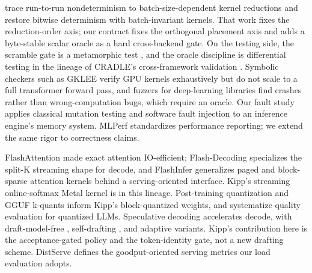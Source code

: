 \documentclass[sigconf,nonacm,screen]{acmart}
\begin{document}
\citet{he2025defeating} trace run-to-run nondeterminism to
batch-size-dependent kernel reductions and restore bitwise determinism with
batch-invariant kernels. That work fixes the reduction-order axis; our
contract fixes the orthogonal placement axis and adds a byte-stable scalar
oracle as a hard cross-backend gate. On the testing side, the scramble gate
is a metamorphic test \citep{chen2018metamorphic}, and the oracle discipline
is differential testing \citep{mckeeman1998differential} in the lineage of
CRADLE's cross-framework validation \citep{pham2019cradle}. Symbolic
checkers such as GKLEE \citep{li2012gklee} verify GPU kernels exhaustively
but do not scale to a full transformer forward pass, and fuzzers for
deep-learning libraries \citep{wei2022freefuzz} find crashes rather than
wrong-computation bugs, which require an oracle. Our fault study applies
classical mutation testing \citep{demillo1978mutation,jia2011mutation} and
software fault injection \citep{hsueh1997fault} to an inference engine's
memory system. MLPerf \citep{reddi2020mlperf} standardizes performance
reporting; we extend the same rigor to correctness claims.

FlashAttention
\citep{dao2022flashattention,dao2024flashattention2,shah2024flashattention3}
made exact attention IO-efficient; Flash-Decoding
\citep{dao2023flashdecoding} specializes the split-K streaming shape for
decode, and FlashInfer \citep{ye2025flashinfer} generalizes paged and
block-sparse attention kernels behind a serving-oriented interface. Kipp's
streaming online-softmax Metal kernel is in this lineage. Post-training
quantization \citep{frantar2023gptq,lin2024awq} and GGUF k-quants
\citep{llamacpp2023gguf} inform Kipp's block-quantized weights, and
\citet{li2024evalquant} systematize quality evaluation for quantized LLMs.
Speculative decoding
\citep{leviathan2023speculative,chen2023speculativesampling} accelerates
decode, with draft-model-free \citep{saxena2023promptlookup,fu2024lookahead},
self-drafting \citep{cai2024medusa,li2024eagle,li2024eagle2}, and adaptive
\citep{huang2025specdecpp,kim2023bild} variants. Kipp's contribution here is
the acceptance-gated policy and the token-identity gate, not a new drafting
scheme. DistServe \citep{zhong2024distserve}
defines the goodput-oriented serving metrics our load evaluation adopts.
\end{document}
